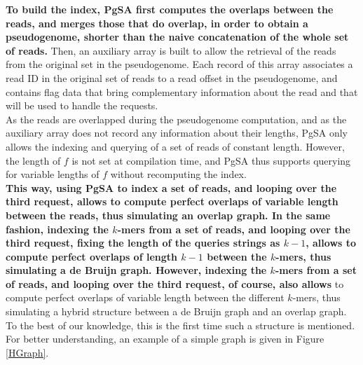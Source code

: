 \documentclass[long, final]{jobim2017}
\begin{document}
\indent \textbf{To build the index, PgSA first computes the overlaps between the reads, and merges those that do overlap, in order to obtain a pseudogenome, shorter than the naive concatenation of the whole set of reads.} Then, an auxiliary array is built to allow the retrieval of the reads from the original set in the pseudogenome. Each record of this array associates a read ID in the original set of reads to a read offset in the pseudogenome, and contains flag data that bring complementary information about the read and that will be used to handle the requests. \\
\indent As the reads are overlapped during the pseudogenome computation, and as the auxiliary array does not record any information about their lengths, PgSA only allows the indexing and querying of a set of reads of constant length. However, the length of $f$ is not set at compilation time, and PgSA thus supports querying for variable lengths of $f$ without recomputing the index. \\
\indent \textbf{This way, using PgSA to index a set of reads, and looping over the third request, allows to compute perfect overlaps of variable length between the reads, thus simulating an overlap graph. In the same fashion, indexing the $k$-mers from a set of reads, and looping over the third request, fixing the length of the queries strings as $k-1$, allows to compute perfect overlaps of length $k-1$ between the $k$-mers, thus simulating a de Bruijn graph. However, indexing the $k$-mers from a set of reads, and looping over the third request, of course, also allows} to compute perfect overlaps of variable length between the different $k$-mers, thus simulating a hybrid structure between a de Bruijn graph and an overlap graph. To the best of our knowledge, this is the first time such a structure is mentioned. For better understanding, an example of a simple graph is given in Figure \ref{HGraph}.
\end{document}
